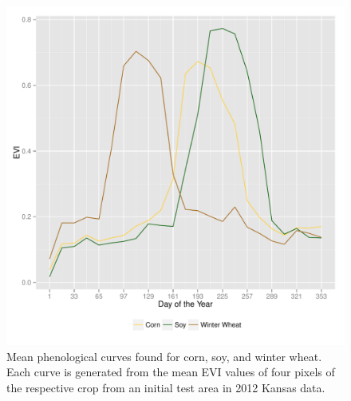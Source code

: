 \begin{figure}
  \centering
  \includegraphics[width=\textwidth]{Graphics/cropCurves.pdf}
  \caption{Mean phenological curves found for corn, soy, and winter wheat. Each curve is generated from the mean EVI values of four pixels of the respective crop from an initial test area in 2012 Kansas data.}
  \label{fig:curves}
\end{figure}

